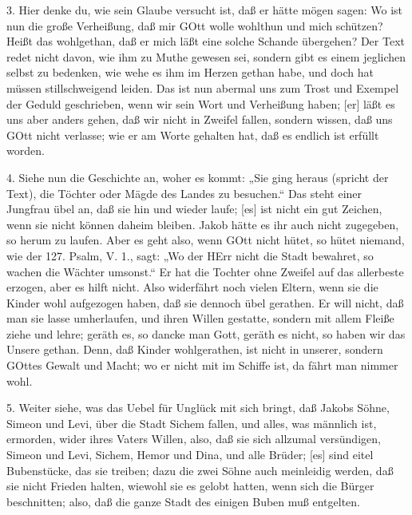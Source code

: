 3. Hier denke du, wie sein Glaube versucht ist, daß er hätte mögen sagen: Wo ist nun die große Verheißung, daß mir GOtt wolle wohlthun und mich schützen? Heißt das wohlgethan, daß er mich läßt eine solche Schande übergehen? Der Text redet nicht davon, wie ihm zu Muthe gewesen sei, sondern gibt es einem jeglichen selbst zu bedenken, wie wehe es ihm im Herzen gethan habe, und doch hat müssen stillschweigend leiden. Das ist nun abermal uns zum Trost und Exempel der Geduld geschrieben, wenn wir sein Wort und Verheißung haben; [er] läßt es uns aber anders gehen, daß wir nicht in Zweifel fallen, sondern wissen, daß uns GOtt nicht verlasse; wie er am Worte gehalten hat, daß es endlich ist erfüllt worden.

4. Siehe nun die Geschichte an, woher es kommt: „Sie ging heraus (spricht der Text), die Töchter oder Mägde des Landes zu besuchen.“ Das steht einer Jungfrau übel an, daß sie hin und wieder laufe; [es] ist nicht ein gut Zeichen, wenn sie nicht können daheim bleiben. Jakob hätte es ihr auch nicht zugegeben, so herum zu laufen. Aber es geht also, wenn GOtt nicht hütet, so hütet niemand, wie der 127. Psalm, V. 1., sagt: „Wo der HErr nicht die Stadt bewahret, so wachen die Wächter umsonst.“ Er hat die Tochter ohne Zweifel auf das allerbeste erzogen, aber es hilft nicht. Also widerfährt noch vielen Eltern, wenn sie die Kinder wohl aufgezogen haben, daß sie dennoch übel gerathen. Er will nicht, daß man sie lasse umherlaufen, und ihren Willen gestatte, sondern mit allem Fleiße ziehe und lehre; geräth es, so dancke man
Gott, geräth es nicht, so haben wir das Unsere gethan. Denn, daß Kinder wohlgerathen, ist nicht in unserer, sondern GOttes Gewalt und Macht; wo er nicht mit im Schiffe ist, da fährt man nimmer wohl.

5. Weiter siehe, was das Uebel für Unglück mit sich bringt, daß Jakobs Söhne, Simeon und Levi, über die Stadt Sichem fallen, und alles, was männlich ist, ermorden, wider ihres Vaters Willen, also, daß sie sich allzumal versündigen, Simeon und Levi, Sichem, Hemor und Dina, und alle Brüder; [es] sind eitel Bubenstücke, das sie treiben; dazu die zwei Söhne auch meinleidig werden, daß sie nicht Frieden halten, wiewohl sie es gelobt hatten, wenn sich die Bürger beschnitten; also, daß die ganze Stadt des einigen Buben muß entgelten.

